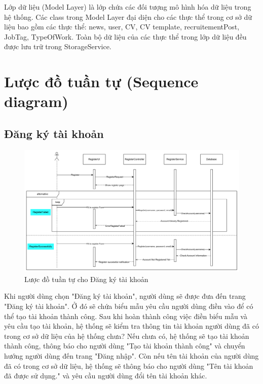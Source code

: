 Lớp dữ liệu (Model Layer) là lớp chứa các đối tượng mô hình hóa dữ liệu trong hệ thống. Các class trong Model Layer đại diện cho các thực thể trong cơ sở dữ liệu bao gồm các thực thể: news, user, CV, CV template, recruitementPost, JobTag, TypeOfWork. Toàn bộ dữ liệu của các thực thể trong lớp dữ liệu đều được lưu trữ trong StorageService.

\section{Lược đồ tuần tự (Sequence diagram)}


\subsection{Đăng ký tài khoản}

\begin{figure}[H]

	\centering
    \includegraphics[scale=0.1]{img/Register_sequenceDiagram.png}
    \caption{Lược đồ tuần tự cho Đăng ký tài khoản}
	
\end{figure}

Khi người dùng chọn "Đăng ký tài khoản", người dùng sẽ được đưa đến trang "Đăng ký tài khoản". Ở đó sẽ chứa biểu mẫu yêu cầu người dùng điền vào để có thể tạo tài khoản thành công. Sau khi hoàn thành công việc điền biểu mẫu và yêu cầu tạo tài khoản, hệ thống sẽ kiểm tra thông tin tài khoản người dùng đã có trong cơ sở dữ liệu của hệ thống chưa? Nếu chưa có, hệ thống sẽ tạo tài khoản thành công, thông báo cho người dùng "Tạo tài khoản thành công" và chuyển hướng người dùng đến trang "Đăng nhập". Còn nếu tên tài khoản của người dùng đã có trong cơ sở dữ liệu, hệ thống sẽ thông báo cho người dùng "Tên tài khoản đã được sử dụng." và yêu cầu người dùng đổi tên tài khoản khác.

